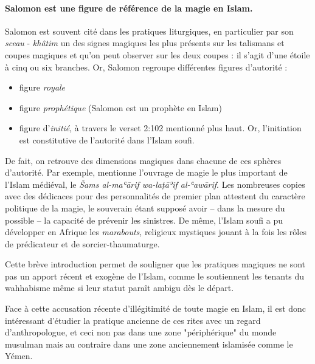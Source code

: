 \paragraph{Salomon est une figure de référence de la magie en Islam.} Salomon est souvent cité dans les pratiques liturgiques, en particulier par son \textit{sceau} - \emph{khâtim} un des signes magiques les plus présents sur les talismans et coupes magiques et qu'on peut observer sur les deux coupes : il s'agit d'une étoile à cinq ou six branches. Or, Salomon regroupe différentes figures d'autorité :
\begin{itemize}
    \item figure \textit{royale} 
    \item figure \textit{prophétique} (Salomon est un prophète en Islam)
    \item figure d'\textit{initié}, à travers le verset 2:102 mentionné plus haut. Or, l'initiation est constitutive de l'autorité dans l'Islam soufi.
\end{itemize}
De fait, on retrouve des dimensions magiques dans chacune de ces sphères d'autorité. Par exemple, \cite{coulon_magie_2017} mentionne l’ouvrage de magie le plus important de l’Islam médiéval, le \textit{Šams al-maʿārif wa-laṭāʾif al-ʿawārif}. Les nombreuses copies avec des dédicaces pour des personnalités de premier plan attestent du caractère politique de la magie, le souverain étant supposé avoir – dans la mesure du possible – la capacité de prévenir les sinistres.  
De même, l'Islam soufi a pu développer en Afrique les \textit{marabouts}, religieux mystiques jouant à la fois les rôles de prédicateur et de sorcier-thaumaturge. 

Cette brève introduction permet de souligner que les pratiques magiques ne sont pas un apport récent et exogène de l'Islam, comme le soutiennent les tenants du wahhabisme même si leur statut paraît 
ambigu dès le départ. 

Face à cette accusation récente d'illégitimité de toute magie en Islam, il est donc intéressant d'étudier  la pratique ancienne de ces rites avec un regard d'anthropologue, et ceci non pas dans une zone "périphérique" du monde musulman mais au contraire dans une zone anciennement islamisée comme le Yémen.


